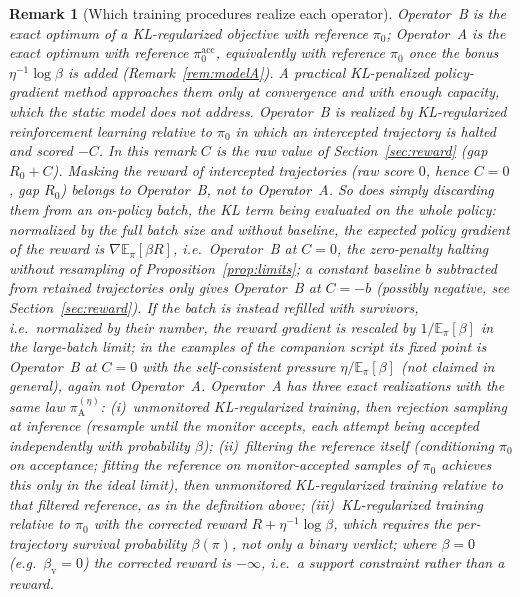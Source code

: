 \documentclass[11pt,a4paper]{article}
\newtheorem{remark}[theorem]{Remark}
\newcommand{\E}{\mathbb{E}}
\begin{document}
\begin{remark}[Which training procedures realize each operator]\label{rem:algos}
Operator~B is the exact optimum of a KL-regularized objective with reference $\pi_0$; Operator~A is the exact optimum with reference $\pi_0^{\mathrm{acc}}$, equivalently with reference $\pi_0$ once the bonus $\eta^{-1}\log\beta$ is added (Remark~\ref{rem:modelA}). A practical KL-penalized policy-gradient method approaches them only at convergence and with enough capacity, which the static model does not address.
\emph{Operator~B} is realized by KL-regularized reinforcement learning relative to $\pi_0$ in which an intercepted trajectory is halted and scored $-C$. In this remark $C$ is the raw value of Section~\ref{sec:reward} (gap $R_0 + C$). Masking the reward of intercepted trajectories (raw score $0$, hence $C = 0$, gap $R_0$) belongs to Operator~B, not to Operator~A. So does simply discarding them from an on-policy batch, the KL term being evaluated on the whole policy: normalized by the full batch size and without baseline, the expected policy gradient of the reward is $\nabla\E_{\pi}[\beta R]$, i.e.\ Operator~B at $C = 0$, the zero-penalty halting without resampling of Proposition~\ref{prop:limits}; a constant baseline $b$ subtracted from retained trajectories only gives Operator~B at $C = -b$ (possibly negative, see Section~\ref{sec:reward}). If the batch is instead refilled with survivors, i.e.\ normalized by their number, the reward gradient is rescaled by $1/\E_{\pi}[\beta]$ in the large-batch limit; in the examples of the companion script its fixed point is Operator~B at $C = 0$ with the self-consistent pressure $\eta/\E_{\pi}[\beta]$ (not claimed in general), again not Operator~A.
\emph{Operator~A} has three exact realizations with the same law $\pi_{\mathrm{A}}^{(\eta)}$: (i)~unmonitored KL-regularized training, then rejection sampling at inference (resample until the monitor accepts, each attempt being accepted independently with probability $\beta$); (ii)~filtering the reference itself (conditioning $\pi_0$ on acceptance; fitting the reference on monitor-accepted samples of $\pi_0$ achieves this only in the ideal limit), then unmonitored KL-regularized training relative to that filtered reference, as in the definition above; (iii)~KL-regularized training relative to $\pi_0$ with the corrected reward $R + \eta^{-1}\log\beta$, which requires the per-trajectory survival probability $\beta(\pi)$, not only a binary verdict; where $\beta = 0$ (e.g.\ $\beta_{\mathrm{v}} = 0$) the corrected reward is $-\infty$, i.e.\ a support constraint rather than a reward.

\end{remark}
\end{document}
